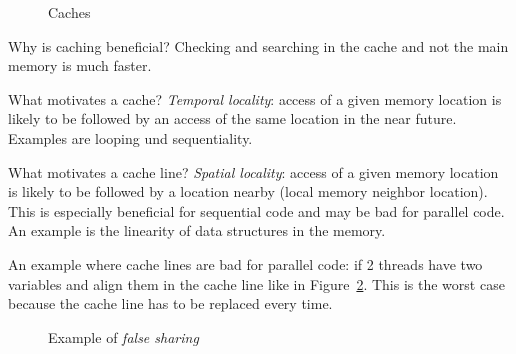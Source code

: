 {\begin{figure}[H]
		\caption{Caches}
		\label{fig:caches}
	\end{figure}
	\par{
		\noindent
		\par{\noindent Why is caching beneficial? Checking and searching in the cache and not the main memory is much faster.}
		\par{
			\noindent
			What motivates a cache? \textit{Temporal locality}: access of a given memory location is likely to be followed by an access of the same location in the near future. Examples are looping und sequentiality.
		}
		\par{
			\noindent
			What motivates a cache line? \textit{Spatial locality}: access of a given memory location is likely to be followed by a location nearby (local memory neighbor location). This is especially beneficial for sequential code and may be bad for parallel code. An example is the linearity of data structures  in the memory.
		}
		\par{
			\noindent
			An example where cache lines are bad for parallel code: if 2 threads have two variables and align them in the cache line like in Figure~\ref{fig:cacheline_bad}. This is the worst case because the cache line has to be replaced every time.
			\begin{figure}[H]
				\centering
				\caption{Example of \textit{false sharing}}
				\label{fig:cacheline_bad}
			\end{figure}
		}
		\clearpage
		\par{
}}}
